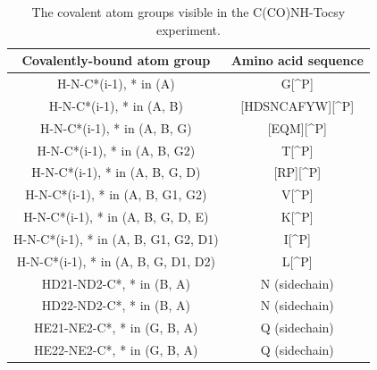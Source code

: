 \begin{table}
  \begin{tabular}{ | c | c | }
    \hline
    Covalently-bound atom group     &  Amino acid sequence  \\  \hline
    H-N-C*(i-1), * in (A)           &  G[\^{}P]             \\  \hline
    H-N-C*(i-1), * in (A, B)        &  [HDSNCAFYW][\^{}P]   \\  \hline
    H-N-C*(i-1), * in (A, B, G)     &  [EQM][\^{}P]         \\  \hline
    H-N-C*(i-1), * in (A, B, G2)    &  T[\^{}P]             \\  \hline
    H-N-C*(i-1), * in (A, B, G, D)  &  [RP][\^{}P]          \\  \hline
    H-N-C*(i-1), * in (A, B, G1, G2)    &  V[\^{}P]         \\  \hline
    H-N-C*(i-1), * in (A, B, G, D, E)   &  K[\^{}P]         \\  \hline
    H-N-C*(i-1), * in (A, B, G1, G2, D1)&  I[\^{}P]         \\  \hline
    H-N-C*(i-1), * in (A, B, G, D1, D2) &  L[\^{}P]         \\  \hline
    HD21-ND2-C*, * in (B, A)    &  N (sidechain)            \\  \hline
    HD22-ND2-C*, * in (B, A)    &  N (sidechain)            \\  \hline
    HE21-NE2-C*, * in (G, B, A)  &  Q (sidechain)           \\  \hline
    HE22-NE2-C*, * in (G, B, A)  &  Q (sidechain)           \\  \hline
  \end{tabular}
  \caption{The covalent atom groups visible in the C(CO)NH-Tocsy experiment.}
  \label{cconh_peaktypes}
\end{table}

